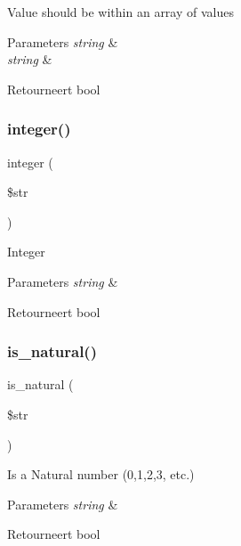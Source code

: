 Value should be within an array of values


\begin{DoxyParams}{Parameters}
{\em string} & \\
\hline
{\em string} & \\
\hline
\end{DoxyParams}
\begin{DoxyReturn}{Retourneert}
bool 
\end{DoxyReturn}
\mbox{\label{class_c_i___form__validation_af1c6586c2e80ccbb28b09803c3b5461c}} 
\subsubsection{\texorpdfstring{integer()}{integer()}}
{\footnotesize\ttfamily integer (\begin{DoxyParamCaption}\item[{}]{\$str }\end{DoxyParamCaption})}

Integer


\begin{DoxyParams}{Parameters}
{\em string} & \\
\hline
\end{DoxyParams}
\begin{DoxyReturn}{Retourneert}
bool 
\end{DoxyReturn}
\mbox{\label{class_c_i___form__validation_aaf9d0b9bdaaef3658a78dd6a01629e5d}} 
\subsubsection{\texorpdfstring{is\_natural()}{is\_natural()}}
{\footnotesize\ttfamily is\+\_\+natural (\begin{DoxyParamCaption}\item[{}]{\$str }\end{DoxyParamCaption})}

Is a Natural number (0,1,2,3, etc.)


\begin{DoxyParams}{Parameters}
{\em string} & \\
\hline
\end{DoxyParams}
\begin{DoxyReturn}{Retourneert}
bool 
\end{DoxyReturn}
\mbox{\label{class_c_i___form__validation_ae4f399db6305e565bcf9acd70eea86a6}} 
